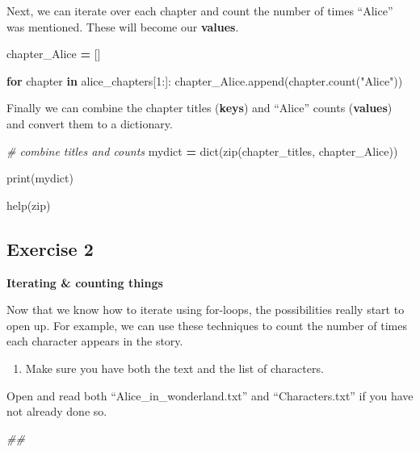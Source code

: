 \documentclass[
]{book}
\newenvironment{Shaded}{\begin{snugshade}}{\end{snugshade}}
\newcommand{\BuiltInTok}[1]{#1}
\newcommand{\CommentTok}[1]{\textcolor[rgb]{0.56,0.35,0.01}{\textit{#1}}}
\newcommand{\ControlFlowTok}[1]{\textcolor[rgb]{0.13,0.29,0.53}{\textbf{#1}}}
\newcommand{\DecValTok}[1]{\textcolor[rgb]{0.00,0.00,0.81}{#1}}
\newcommand{\KeywordTok}[1]{\textcolor[rgb]{0.13,0.29,0.53}{\textbf{#1}}}
\newcommand{\NormalTok}[1]{#1}
\newcommand{\OperatorTok}[1]{\textcolor[rgb]{0.81,0.36,0.00}{\textbf{#1}}}
\newcommand{\StringTok}[1]{\textcolor[rgb]{0.31,0.60,0.02}{#1}}
\providecommand{\tightlist}{%
  \setlength{\itemsep}{0pt}\setlength{\parskip}{0pt}}
\begin{document}
Next, we can iterate over each chapter and count the number of times ``Alice'' was mentioned. These will become our \textbf{values}.

\begin{Shaded}
\begin{Highlighting}[]
\NormalTok{chapter_Alice }\OperatorTok{=}\NormalTok{ []}

\ControlFlowTok{for}\NormalTok{ chapter }\KeywordTok{in}\NormalTok{ alice_chapters[}\DecValTok{1}\NormalTok{:]:}
\NormalTok{    chapter_Alice.append(chapter.count(}\StringTok{"Alice"}\NormalTok{))}
\end{Highlighting}
\end{Shaded}

Finally we can combine the chapter titles (\textbf{keys}) and ``Alice'' counts (\textbf{values}) and convert them to a dictionary.

\begin{Shaded}
\begin{Highlighting}[]
\CommentTok{# combine titles and counts}
\NormalTok{mydict }\OperatorTok{=} \BuiltInTok{dict}\NormalTok{(}\BuiltInTok{zip}\NormalTok{(chapter_titles, chapter_Alice))}

\BuiltInTok{print}\NormalTok{(mydict)}

\BuiltInTok{help}\NormalTok{(}\BuiltInTok{zip}\NormalTok{)         }
\end{Highlighting}
\end{Shaded}

\hypertarget{exercise-2-3}{%
\subsection{Exercise 2}\label{exercise-2-3}}

\textbf{Iterating \& counting things}

Now that we know how to iterate using for-loops, the possibilities really start to open up. For example, we can use these techniques to count the number of times each character appears in the story.

\begin{enumerate}
\def\labelenumi{\arabic{enumi}.}
\tightlist
\item
  Make sure you have both the text and the list of characters.
\end{enumerate}

Open and read both ``Alice\_in\_wonderland.txt'' and
``Characters.txt'' if you have not already done so.

\begin{Shaded}
\begin{Highlighting}[]
\CommentTok{##}
\end{Highlighting}
\end{Shaded}
\end{document}
